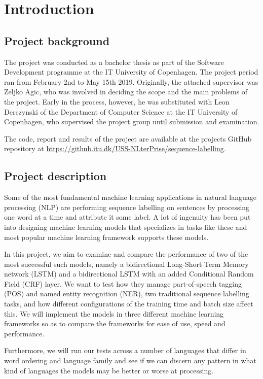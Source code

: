 
\section{Introduction}

\subsection{Project background}


The project was conducted as a bachelor thesis as part of the Software
Development programme at the IT University of Copenhagen. The project period ran
from February 2nd to May 15th 2019. Originally, the attached supervisor was
Zeljko Agic, who was involved in deciding the scope and the main problems of the
project. Early in the process, however, he was substituted with Leon Derczynski
of the Department of Computer Science at the IT University of Copenhagen, who
supervised the project group until submission and examination.

The code, report and results of the project are available at the projects GitHub
repository at \url{https://github.itu.dk/USS-NLterPrise/sequence-labelling}.


\subsection{Project description}

Some of the most fundamental machine learning applications in natural language
processing (NLP) are performing sequence labelling on sentences by processing
one word at a time and attribute it some label. A lot of ingenuity has been put
into designing machine learning models that specializes in tasks like these and
most popular machine learning framework supports these models.

In this project, we aim to examine and compare the performance of two of the
most successful such models, namely a bidirectional Long-Short Term Memory
network (LSTM) and a bidirectional LSTM with an added Conditional Random Field
(CRF) layer. We want to test how they manage part-of-speech tagging (POS) and
named entity recognition (NER), two traditional sequence labelling tasks, and
how different configurations of the training time and batch size affect this. We
will implement the models in three different machine learning frameworks so as
to compare the frameworks for ease of use, speed and performance.

Furthermore, we will run our tests across a number of languages that differ in
word ordering and language family and see if we can discern any pattern in what
kind of languages the models may be better or worse at processing.


